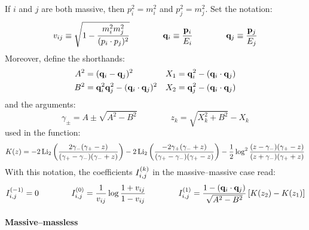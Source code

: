 If $ i $ and $ j $ are both massive, then $ p_i^2 = m_i^2 $ and $ p_j^2 = m_j^2 $. Set the notation:
\begin{equation}
  v_{ij} \equiv \sqrt{1 - \frac{m_i^2 m_j^2}{(p_i \cdot p_j)^2}}
  \qquad \qquad
  \mathbf{q}_i \equiv \frac{\mathbf{p}_i}{E_i}
  \qquad \qquad
  \mathbf{q}_j \equiv \frac{\mathbf{p}_j}{E_j}
  \label{eq:v-def}
\end{equation}
Moreover, define the shorthands:
\begin{align*}
  A^2 &= (\mathbf{q}_i - \mathbf{q}_j)^2 & X_1 &= \mathbf{q}_i^2 - (\mathbf{q}_i \cdot \mathbf{q}_j) \\
  B^2 &= \mathbf{q}_i^2 \mathbf{q}_j^2 - (\mathbf{q}_i \cdot \mathbf{q}_j)^2 & X_2 &= \mathbf{q}_j^2 - (\mathbf{q}_i \cdot \mathbf{q}_j)
\end{align*}
and the arguments:
\begin{equation*}
  \gamma_{\pm} = A \pm \sqrt{A^2 - B^2}
  \qquad \qquad
  z_k = \sqrt{X_k^2 + B^2} - X_k
\end{equation*}
used in the function:
\begin{equation*}
  K(z) = - 2 \operatorname{Li_2} \left( \frac{2\gamma_- (\gamma_+ - z)}{(\gamma_+ - \gamma_-) (\gamma_- + z)} \right) - 2 \operatorname{Li_2} \left( \frac{-2\gamma_+(\gamma_- + z)}{(\gamma_+ - \gamma_-) (\gamma_+ - z)} \right) - \frac{1}{2} \log^2 \frac{(z - \gamma_-) (\gamma_+ - z)}{(z + \gamma_-) (\gamma_+ + z)}
\end{equation*}
With this notation, the coefficients $ I_{i,j}^{(k)} $ in the massive--massive case read:
\begin{equation}
  I_{i,j}^{(-1)} = 0
  \qquad \qquad
  I_{i,j}^{(0)} = \frac{1}{v_{ij}} \log \frac{1 + v_{ij}}{1 - v_{ij}}
  \qquad \qquad
  I_{i,j}^{(1)} = \frac{1 - (\mathbf{q}_i \cdot \mathbf{q}_j)}{\sqrt{A^2 - B^2}} \left[ K(z_2) - K(z_1) \right]
  \label{eq:i-mm}
\end{equation}

\paragraph{Massive--massless}

